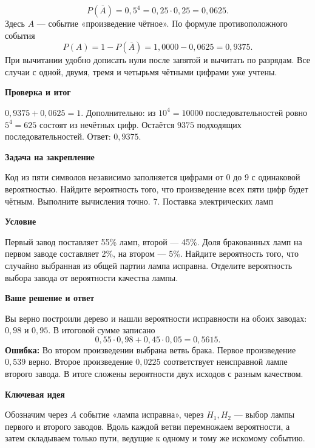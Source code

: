 \documentclass[a4paper,12pt]{article}
\newcommand{\topic}[1]{\par\medskip\textcolor{darkaccent}{\textbf{#1}}\par\nopagebreak}
\newcommand{\err}[1]{\textcolor{error}{\textbf{Ошибка:}} #1}
\newcommand{\task}[2]{\phantomsection\label{task:#1}{\Large\color{accent} #1. #2}\par\medskip}
\begin{document}
\[
P(\overline A)=0,5^4=0,25\cdot0,25=0,0625.
\]
Здесь $A$ --- событие «произведение чётное». По формуле противоположного события
\[
P(A)=1-P(\overline A)=1,0000-0,0625=0,9375.
\]
При вычитании удобно дописать нули после запятой и вычитать по разрядам. Все случаи с одной, двумя, тремя и четырьмя чётными цифрами уже учтены.
\topic{Проверка и итог}
$0,9375+0,0625=1$. Дополнительно: из $10^4=10000$ последовательностей ровно $5^4=625$ состоят из нечётных цифр. Остаётся $9375$ подходящих последовательностей. Ответ: \textbf{$0,9375$}.
\topic{Задача на закрепление}
Код из пяти символов независимо заполняется цифрами от 0 до 9 с одинаковой вероятностью. Найдите вероятность того, что произведение всех пяти цифр будет чётным. Выполните вычисления точно.
\clearpage
\task{7}{Поставка электрических ламп}
\topic{Условие}
Первый завод поставляет 55\% ламп, второй --- 45\%. Доля бракованных ламп на первом заводе составляет 2\%, на втором --- 5\%. Найдите вероятность того, что случайно выбранная из общей партии лампа исправна. Отделите вероятность выбора завода от вероятности качества лампы.
\topic{Ваше решение и ответ}
Вы верно построили дерево и нашли вероятности исправности на обоих заводах: $0,98$ и $0,95$. В итоговой сумме записано
\[
0,55\cdot0,98+0,45\cdot0,05=0,5615.
\]
\err{Во втором произведении выбрана ветвь брака.} Первое произведение $0,539$ верно. Второе произведение $0,0225$ соответствует неисправной лампе второго завода. В итоге сложены вероятности двух исходов с разным качеством.
\topic{Ключевая идея}
Обозначим через $A$ событие «лампа исправна», через $H_1,H_2$ --- выбор лампы первого и второго заводов. Вдоль каждой ветви перемножаем вероятности, а затем складываем только пути, ведущие к одному и тому же искомому событию.
\begin{center}
\end{center}
\end{document}
